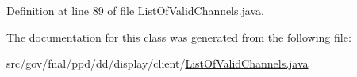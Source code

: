 Definition at line 89 of file List\-Of\-Valid\-Channels.\-java.



The documentation for this class was generated from the following file\-:\begin{DoxyCompactItemize}
\item 
src/gov/fnal/ppd/dd/display/client/\hyperlink{ListOfValidChannels_8java}{List\-Of\-Valid\-Channels.\-java}\end{DoxyCompactItemize}
